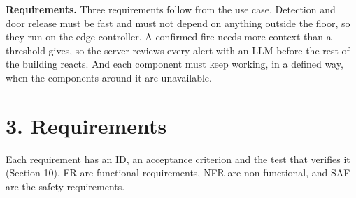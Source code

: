 \documentclass[11pt]{article}
\begin{document}
\textbf{Requirements.} Three requirements follow from the use case. Detection and door release 
must be fast and must not depend on anything outside the floor, so they run on the edge controller. 
A confirmed fire needs more context than a threshold gives, so the server reviews every alert with 
an LLM before the rest of the building reacts. And each component must keep working, in a defined 
way, when the components around it are unavailable.


\section{3. Requirements}

Each requirement has an ID, an acceptance criterion and the test that verifies it (Section 10). 
FR are functional requirements, NFR are non-functional, and SAF are the safety requirements.
\end{document}
